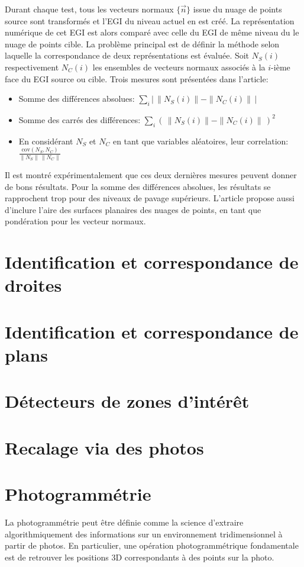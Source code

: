 \documentclass[a4paper,10pt]{scrreprt}
\begin{document}
Durant chaque test, tous les vecteurs normaux $\{ \vec{n} \}$ issue du nuage de points source sont transformés et l'EGI du niveau actuel en est créé. La représentation numérique de cet EGI est alors comparé avec celle du EGI de même niveau du le nuage de points cible. La problème principal est de définir la méthode selon laquelle la correspondance de deux représentations est évaluée. Soit $N_S(i)$ respectivement $N_C(i)$ les ensembles de vecteurs normaux associés à la $i$-ième face du EGI source ou cible. Trois mesures sont présentées dans l'article:
\begin{itemize}
	\item Somme des différences absolues: $\sum_{i} \left| \, \|N_S(i)\| - \|N_C(i)\| \, \right|$
	\item Somme des carrés des différences: $\sum_{i} \left( \, \|N_S(i)\| - \|N_C(i)\| \, \right)^2$
	\item En considérant $N_S$ et $N_C$ en tant que variables aléatoires, leur correlation: $\frac{\text{cov}(N_S, N_C)}{\|N_S\| \, \|N_C\|}$
\end{itemize}
Il est montré expérimentalement que ces deux dernières mesures peuvent donner de bons résultats. Pour la somme des différences absolues, les résultats se rapprochent trop pour des niveaux de pavage supérieurs. L'article propose aussi d'inclure l'aire des surfaces planaires des nuages de points, en tant que pondération pour les vecteur normaux.


\section{Identification et correspondance de droites}

\section{Identification et correspondance de plans}

\section{Détecteurs de zones d'intérêt}

\section{Recalage via des photos}

\section{Photogrammétrie}
La photogrammétrie peut être définie comme la science d'extraire algorithmiquement des informations sur un environnement tridimensionnel à partir de photos. En particulier, une opération photogrammétrique fondamentale est de retrouver les positions 3D correspondants à des points sur la photo.
\end{document}
